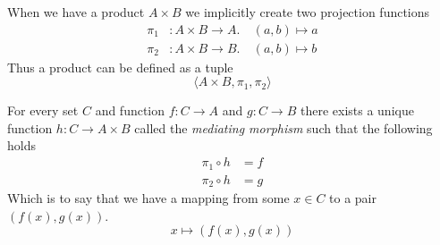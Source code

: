 \documentclass[10pt]{article}
\begin{document}
\begin{definition}
  When we have a product $A \times B$ we implicitly create two projection functions
  \[
    \begin{aligned}
      \pi_1 & : A \times B \rightarrow A.\ & (a, b) \mapsto a \\
      \pi_2 & : A \times B \rightarrow B.\ & (a, b) \mapsto b
    \end{aligned}
  \]
  Thus a product can be defined as a tuple
  \[
    \langle A\times B, \pi_1, \pi_2 \rangle
  \]
\end{definition}

\begin{definition}
  For every set $C$ and function $f : C \rightarrow A$ and $g : C \rightarrow B$ there exists a unique function $h : C \rightarrow A \times B$ called the \textit{mediating morphism} such that the following holds
  \[
    \begin{aligned}
      \pi_1 \circ h & = f \\
      \pi_2 \circ h & = g
    \end{aligned}
  \]
  Which is to say that we have a mapping from some $x\in C$ to a pair $(f(x), g(x))$.
  \[
    x \mapsto (f(x), g(x))
  \]
\end{definition}
\end{document}

